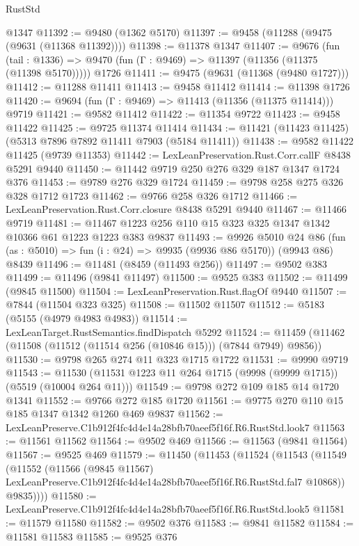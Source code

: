 \begin{lexlean}{RustStd}
\begin{coremodule}
    @1347
@11392 := @9480 (@1362 @5170)
@11397 := @9458 (@11288 (@9475 (@9631 (@11368 @11392))))
@11398 := @11378 @1347
@11407 := @9676
    (fun (tail : @1336) => @9470 (fun (Γ : @9469) => @11397 (@11356 (@11375 (@11398 @5170)))))
    @1726
@11411 := @9475 (@9631 (@11368 (@9480 @1727)))
@11412 := @11288 @11411
@11413 := @9458 @11412
@11414 := @11398 @1726
@11420 := @9694 (fun (Γ : @9469) => @11413 (@11356 (@11375 @11414))) @9719
@11421 := @9582 @11412
@11422 := @11354 @9722
@11423 := @9458 @11422
@11425 := @9725 @11374 @11414
@11434 := @11421 (@11423 @11425) (@5313 @7896 @7892 @11411 @7903 (@5184 @11411))
@11438 := @9582 @11422 @11425 (@9739 @11353)
@11442 := LexLeanPreservation.Rust.Corr.callF @8438 @5291 @9440
@11450 := @11442 @9719 @250 @276 @329 @187 @1347 @1724 @376
@11453 := @9789 @276 @329 @1724
@11459 := @9798 @258 @275 @326 @328 @1712 @1723
@11462 := @9766 @258 @326 @1712
@11466 := LexLeanPreservation.Rust.Corr.closure @8438 @5291 @9440
@11467 := @11466 @9719
@11481 := @11467 @1223 @256 @110 @15 @323 @325 @1347 @1342 @10366 @61 @1223 @1223 @383 @9837
@11493 := @9926
    @5010
    @24
    @86
    (fun (as : @5010) => fun (i : @24) => @9935 (@9936 @86 @5170))
    (@9943 @86)
    @8439
@11496 := @11481 (@8459 (@11493 @256))
@11497 := @9502 @383
@11499 := @11496 (@9841 @11497)
@11500 := @9525 @383
@11502 := @11499 (@9845 @11500)
@11504 := LexLeanPreservation.Rust.flagOf @9440
@11507 := @7844 (@11504 @323 @325)
@11508 := @11502 @11507
@11512 := @5183 (@5155 (@4979 @4983 @4983))
@11514 := LexLeanTarget.RustSemantics.findDispatch @5292
@11524 := @11459 (@11462 (@11508 (@11512 (@11514 @256 (@10846 @15))) (@7844 @7949) @9856))
@11530 := @9798 @265 @274 @11 @323 @1715 @1722
@11531 := @9990 @9719
@11543 := @11530 (@11531 @1223 @11 @264 @1715 (@9998 (@9999 @1715)) (@5519 (@10004 @264 @11)))
@11549 := @9798 @272 @109 @185 @14 @1720 @1341
@11552 := @9766 @272 @185 @1720
@11561 := @9775 @270 @110 @15 @185 @1347 @1342 @1260 @469 @9837
@11562 := LexLeanPreserve.C1b912f4fc4d4e14a28bfb70aeef5f16f.R6.RustStd.look7
@11563 := @11561 @11562
@11564 := @9502 @469
@11566 := @11563 (@9841 @11564)
@11567 := @9525 @469
@11579 := @11450
    (@11453
      (@11524
        (@11543
          (@11549
            (@11552
              (@11566
                (@9845 @11567)
                LexLeanPreserve.C1b912f4fc4d4e14a28bfb70aeef5f16f.R6.RustStd.fal7
                @10868))
            @9835))))
@11580 := LexLeanPreserve.C1b912f4fc4d4e14a28bfb70aeef5f16f.R6.RustStd.look5
@11581 := @11579 @11580
@11582 := @9502 @376
@11583 := @9841 @11582
@11584 := @11581 @11583
@11585 := @9525 @376

\end{coremodule}
\end{lexlean}
